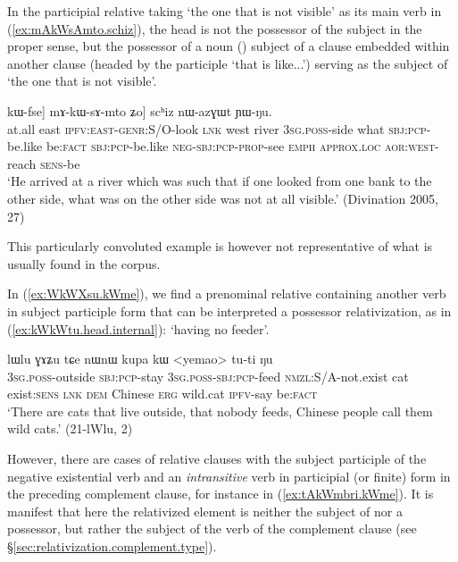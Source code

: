  In the participial relative taking  `the one that is not visible' as its main verb in (\ref{ex:mAkWsAmto.schiz}), the head  is not the possessor of the subject in the proper sense, but the possessor of a noun () subject of a clause embedded within another clause (headed by the participle  `that is like...') serving as the subject of  `the one that is not visible'.  

  \begin{exe}
\ex \label{ex:mAkWsAmto.schiz}
 \gll  [maka tɕekɯ ku-kɯ-ru tɕe tɕendi \textbf{smar} [[ɯ-βzɯr tɕʰi kɯ-fse ŋu] kɯ-fse] mɤ-kɯ-sɤ-mto ʑo] scʰiz nɯ-azɣɯt ɲɯ-ŋu. \\
 at.all east \textsc{ipfv}:\textsc{east}-\textsc{genr}:S/O-look \textsc{lnk} west river \textsc{3sg}.\textsc{poss}-side what \textsc{sbj}:\textsc{pcp}-be.like be:\textsc{fact} \textsc{sbj}:\textsc{pcp}-be.like \textsc{neg}-\textsc{sbj}:\textsc{pcp}-\textsc{prop}-see \textsc{emph} \textsc{approx}.\textsc{loc} \textsc{aor}:\textsc{west}-reach \textsc{sens}-be \\
\glt `He arrived at a river which was such that if one looked from one bank to the other side, what was on the other side was not at all visible.' (Divination 2005, 27)
 \end{exe}
 
 This particularly convoluted example is however not representative of what is usually found in the corpus.

In (\ref{ex:WkWXsu.kWme}), we find a prenominal relative containing another verb in subject participle form that can be interpreted a possessor relativization, as in (\ref{ex:kWkWtu.head.internal}):   `having no feeder'.

\begin{exe}
\ex \label{ex:WkWXsu.kWme}
  lɯlu ɣɤʑu tɕe nɯnɯ kupa kɯ <yemao> tu-ti ŋu \\
 \textsc{3sg}.\textsc{poss}-outside \textsc{sbj}:\textsc{pcp}-stay \textsc{3sg}.\textsc{poss}-\textsc{sbj}:\textsc{pcp}-feed \textsc{nmzl}:S/A-not.exist cat exist:\textsc{sens} \textsc{lnk} \textsc{dem} Chinese \textsc{erg} wild.cat \textsc{ipfv}-say be:\textsc{fact} \\
 \glt `There are cats that live outside, that nobody feeds, Chinese people call them wild cats.' (21-lWlu, 2)
 \end{exe}

However, there are cases of relative clauses with the subject participle of the negative existential verb  and an \textit{intransitive} verb in participial (or finite) form in the preceding complement clause, for instance  in (\ref{ex:tAkWmbri.kWme}). It is manifest that here the relativized element is neither the subject of  nor a possessor, but rather the subject of the verb of the complement clause  (see §\ref{sec:relativization.complement.type}).

